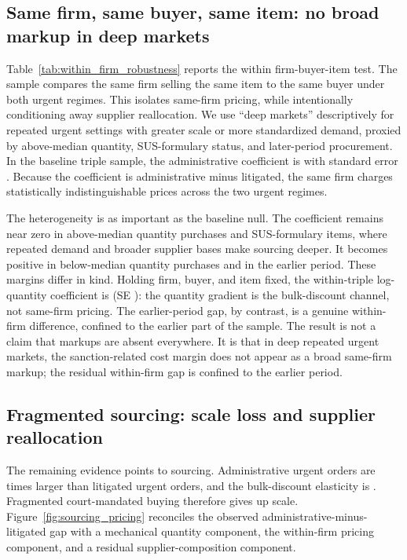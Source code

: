 \subsection{Same firm, same buyer, same item: no broad markup in deep markets}
\label{subsec:within_firm}

Table~\ref{tab:within_firm_robustness} reports the within firm-buyer-item test. The sample compares the same firm selling the same item to the same buyer under both urgent regimes. This isolates same-firm pricing, while intentionally conditioning away supplier reallocation. We use ``deep markets'' descriptively for repeated urgent settings with greater scale or more standardized demand, proxied by above-median quantity, SUS-formulary status, and later-period procurement. In the baseline triple sample, the administrative coefficient is \BPutgTripleCoefUTG{} with standard error \BPutgTripleSEUTG{}. Because the coefficient is administrative minus litigated, the same firm charges statistically indistinguishable prices across the two urgent regimes.



The heterogeneity is as important as the baseline null. The coefficient remains near zero in above-median quantity purchases and SUS-formulary items, where repeated demand and broader supplier bases make sourcing deeper. It becomes positive in below-median quantity purchases and in the earlier period. These margins differ in kind. Holding firm, buyer, and item fixed, the within-triple log-quantity coefficient is \BPwfWithinQtyCoef{} (SE \BPwfWithinQtySE{}): the quantity gradient is the bulk-discount channel, not same-firm pricing. The earlier-period gap, by contrast, is a genuine within-firm difference, confined to the earlier part of the sample. The result is not a claim that markups are absent everywhere. It is that in deep repeated urgent markets, the sanction-related cost margin does not appear as a broad same-firm markup; the residual within-firm gap is confined to the earlier period.

\subsection{Fragmented sourcing: scale loss and supplier reallocation}
\label{subsec:sourcing}

The remaining evidence points to sourcing. Administrative urgent orders are \BPutgQtyAdminFoldPref{} times larger than litigated urgent orders, and the bulk-discount elasticity is \BPutgBulkElasticity{}. Fragmented court-mandated buying therefore gives up scale. Figure~\ref{fig:sourcing_pricing} reconciles the observed administrative-minus-litigated gap with a mechanical quantity component, the within-firm pricing component, and a residual supplier-composition component.

